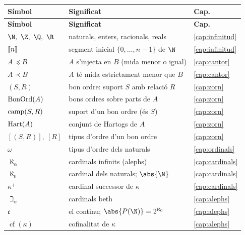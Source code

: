 \noindent
\begin{longtable}{@{}p{}p{}p{}@{}}
\toprule
\textbf{Símbol} & \textbf{Significat} & \textbf{Cap.}\\
\midrule
\endfirsthead
\toprule
\textbf{Símbol} & \textbf{Significat} & \textbf{Cap.}\\
\midrule
\endhead
\bottomrule
\endfoot
\(\N,\ \Z,\ \Q,\ \R\) & naturals, enters, racionals, reals & \ref{cap:infinitud}\\
\(\llbracket n\rrbracket\) & segment inicial \(\{0,\dots,n-1\}\) de \(\N\) & \ref{cap:infinitud}\\
\(A\preceq B\) & \(A\) s'injecta en \(B\) (mida menor o igual) & \ref{cap:cantor}\\
\(A\prec B\) & \(A\) té mida estrictament menor que \(B\) & \ref{cap:cantor}\\
\((S,R)\) & bon ordre: suport \(S\) amb relació \(R\) & \ref{cap:zorn}\\
\(\operatorname{BonOrd}(A)\) & bons ordres sobre parts de \(A\) & \ref{cap:zorn}\\
\(\operatorname{camp}(S,R)\) & suport d'un bon ordre (és \(S\)) & \ref{cap:zorn}\\
\(\operatorname{Hart}(A)\) & conjunt de Hartogs de \(A\) & \ref{cap:zorn}\\
\([(S,R)],\ [R]\) & tipus d'ordre d'un bon ordre & \ref{cap:zorn}\\
\(\omega\) & tipus d'ordre dels naturals & \ref{cap:ordinals}\\
\(\aleph_\alpha\) & cardinals infinits (alephs) & \ref{cap:cardinals}\\
\(\aleph_0\) & cardinal dels naturals; \(\abs{\N}\) & \ref{cap:cardinals}\\
\(\kappa^{+}\) & cardinal successor de \(\kappa\) & \ref{cap:cardinals}\\
\(\beth_\alpha\) & cardinals beth & \ref{cap:alephs}\\
\(\mathfrak c\) & el continu; \(\abs{P(\N)}=2^{\aleph_0}\) & \ref{cap:alephs}\\
\(\operatorname{cf}(\kappa)\) & cofinalitat de \(\kappa\) & \ref{cap:alephs}\\
\end{longtable}

\endgroup
